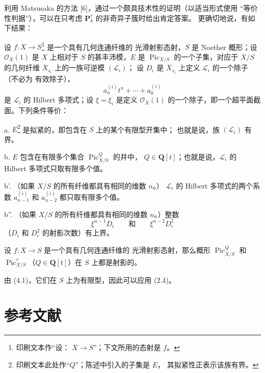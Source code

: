 利用 Matsusaka 的方法 [6]，通过一个颇具技术性的证明（以适当形式使用
“等价性判据”），可以在只考虑 $\mathbf P_k^r$ 的非奇异子簇时给出肯定答案。
更确切地说，有如下结果：

 设 $f:X\longrightarrow S$\footnote{印刷文本作“设：
$X\longrightarrow S$”；下文所用的态射是 $f$。} 是一个具有几何连通纤维的
光滑射影态射，$S$ 是 Noether 概形；设 $\mathcal O_X(1)$ 是 $X$ 上相对于
$S$ 的甚丰沛模，$E$ 是 $\operatorname{Pic}_{X/S}$ 的一个子集，对应于
$X/S$ 的几何纤维 $\overline X_{s_i}$ 上的一族可逆模 $(\mathcal L_i)$；
设 $D_i$ 是 $\overline X_{s_i}$ 上定义 $\mathcal L_i$ 的一个除子（不必为
有效除子），
\[
a_n^{(i)}t^n+\cdots+a_0^{(i)}
\]
是 $\mathcal L_i$ 的 Hilbert 多项式；设 $\xi=\xi_i$ 是定义
$\mathcal O_X(1)$ 的一个除子，即一个超平面截面。下列条件等价：

\noindent a. $E$\footnote{印刷文本此处作“$Q$”；陈述中引入的子集是 $E$，
其拟紧性正表示该族有界。} 是拟紧的，即包含在 $S$ 上的某个有限型开集中；
也就是说，族 $(\mathcal L_i)$ 有界。

\noindent b. $E$ 包含在有限多个集合 $\operatorname{Pic}_{X/S}^Q$ 的并中，
$Q\in\mathbf Q[t]$；也就是说，$\mathcal L_i$ 的 Hilbert 多项式只取有限多个值。

\noindent b'. （如果 $X/S$ 的所有纤维都具有相同的维数 $n$。）
$\mathcal L_i$ 的 Hilbert 多项式的两个系数 $a_{n-1}^{(i)}$ 和
$a_{n-2}^{(i)}$ 都只取有限多个值。

\noindent b''. （如果 $X/S$ 的所有纤维都具有相同的维数 $n$。）整数
\[
\xi^{n-1}D_i\qquad\text{和}\qquad\xi^{n-2}D_i^2
\]
（$D_i$ 和 $D_i^2$ 的射影次数）有上界。

 设 $f:X\longrightarrow S$ 是一个具有几何连通纤维的
光滑射影态射，那么概形 $\operatorname{Pic}_{X/S}^Q$ 和
$\operatorname{Pic}_{X/S}^\tau$（$Q\in\mathbf Q[t]$）在 $S$ 上都是射影的。

由 (4.1)，它们在 $S$ 上为有限型，因此可以应用 (2.4)。

\section*{参考文献}

